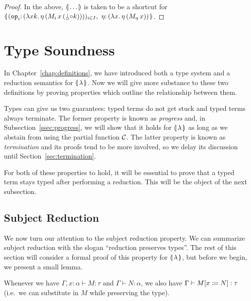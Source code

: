 \begin{proof}
  In the above, $\llparenthesis \, \ldots \, \rrparenthesis$ is taken to be a shortcut for
  $\banana{(\onto{\op{op}_i}{(\lam{x
        k}{\ap{\eta}{(\ap{\ap{M_i}{x}}{(\cherry \compop k)})}})})_{i \in I},\
    \onto{\eta}{(\lam{x}{\etaE{(\ap{M_\eta}{x})}})}}$.
\end{proof}


\section{Type Soundness}
\label{sec:type-soundness}

In Chapter~\ref{chap:definitions}, we have introduced both a type system
and a reduction semantics for $\llparenthesis \, \lambda \, \rrparenthesis$. Now we will give more
substance to these two definitions by proving properties which outline the
relationship between them.

Types can give us two guarantees: typed terms do not get stuck and typed
terms always terminate. The former property is known as \emph{progress}
and, in Subsection~\ref{ssec:progress}, we will show that it holds for
${\llparenthesis \, \lambda \, \rrparenthesis}$ as long as we abstain from using the partial function $\mathcal{C}$. The
latter property is known as \emph{termination} and its proofs tend to be
more involved, so we delay its discussion until
Section~\ref{sec:termination}.

For both of these properties to hold, it will be essential to prove that a
typed term stays typed after performing a reduction. This will be the
object of the next subsection.


\subsection{Subject Reduction}
\label{ssec:subject-reduction}

We now turn our attention to the subject reduction property. We can
summarize subject reduction with the slogan ``reduction preserves
types''. The rest of this section will consider a formal proof of this
property for $\llparenthesis \, \lambda \, \rrparenthesis$, but before we begin, we present a small
lemma.

\begin{lemma}\label{lem:substitution-types}
  
  Whenever we have $\Gamma, x : \alpha \vdash M : \tau$ and
  $\Gamma \vdash N : \alpha$, we also have
  $\Gamma \vdash M[x \coloneqq N] : \tau$ (i.e.\ we can substitute in $M$
  while preserving the type).
\end{lemma}

